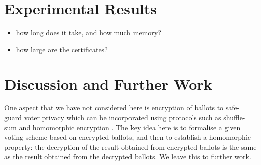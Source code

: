 \documentclass{llncs}
\begin{document}
\section{Experimental Results}
\begin{itemize}
  \item how long does it take, and how much memory?
  \item how large are the certificates?
\end{itemize}


\section{Discussion and Further Work}



One aspect that we have not considered here is encryption of
ballots to safe-guard voter privacy which can be incorporated using
protocols such as shuffle-sum \cite{Benaloh:2009:SSC} and
homomorphic encryption \cite{Yi:2014:HEA}. The key idea here is to
formalise a given voting scheme based on encrypted ballots, and then
to establish a homomorphic property: the decryption of the result
obtained from encrypted ballots is the same as the result obtained from
the decrypted ballots.  We leave this to further work.

%
%
\end{document}
